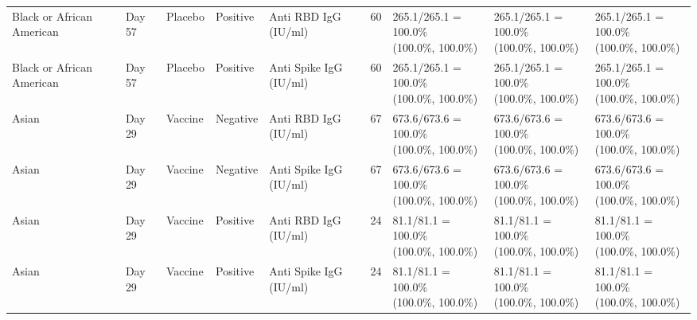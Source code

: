 \documentclass[]{book}
\theoremstyle{definition}
\theoremstyle{definition}
\theoremstyle{definition}
\newcommand{\1}{\mathbbm{1}}
\begin{document}
\begin{landscape}
\begin{ThreePartTable}
\begin{longtable}[t]{>{\raggedright\arraybackslash}p{2.7cm}llllllll}
\hspace{1em}Black or African American & Day 57 & Placebo & Positive & Anti RBD IgG (IU/ml) & 60 & \makecell[l]{265.1/265.1 = 100.0\%\\(100.0\%, 100.0\%)} & \makecell[l]{265.1/265.1 = 100.0\%\\(100.0\%, 100.0\%)} & \makecell[l]{265.1/265.1 = 100.0\%\\(100.0\%, 100.0\%)}\\
\hspace{1em}Black or African American & Day 57 & Placebo & Positive & Anti Spike IgG (IU/ml) & 60 & \makecell[l]{265.1/265.1 = 100.0\%\\(100.0\%, 100.0\%)} & \makecell[l]{265.1/265.1 = 100.0\%\\(100.0\%, 100.0\%)} & \makecell[l]{265.1/265.1 = 100.0\%\\(100.0\%, 100.0\%)}\\
\hspace{1em}Asian & Day 29 & Vaccine & Negative & Anti RBD IgG (IU/ml) & 67 & \makecell[l]{673.6/673.6 = 100.0\%\\(100.0\%, 100.0\%)} & \makecell[l]{673.6/673.6 = 100.0\%\\(100.0\%, 100.0\%)} & \makecell[l]{673.6/673.6 = 100.0\%\\(100.0\%, 100.0\%)}\\
\hspace{1em}Asian & Day 29 & Vaccine & Negative & Anti Spike IgG (IU/ml) & 67 & \makecell[l]{673.6/673.6 = 100.0\%\\(100.0\%, 100.0\%)} & \makecell[l]{673.6/673.6 = 100.0\%\\(100.0\%, 100.0\%)} & \makecell[l]{673.6/673.6 = 100.0\%\\(100.0\%, 100.0\%)}\\
\hspace{1em}Asian & Day 29 & Vaccine & Positive & Anti RBD IgG (IU/ml) & 24 & \makecell[l]{81.1/81.1 = 100.0\%\\(100.0\%, 100.0\%)} & \makecell[l]{81.1/81.1 = 100.0\%\\(100.0\%, 100.0\%)} & \makecell[l]{81.1/81.1 = 100.0\%\\(100.0\%, 100.0\%)}\\
\hspace{1em}Asian & Day 29 & Vaccine & Positive & Anti Spike IgG (IU/ml) & 24 & \makecell[l]{81.1/81.1 = 100.0\%\\(100.0\%, 100.0\%)} & \makecell[l]{81.1/81.1 = 100.0\%\\(100.0\%, 100.0\%)} & \makecell[l]{81.1/81.1 = 100.0\%\\(100.0\%, 100.0\%)}\\

\end{longtable}
\end{ThreePartTable}
\end{landscape}
\end{document}
